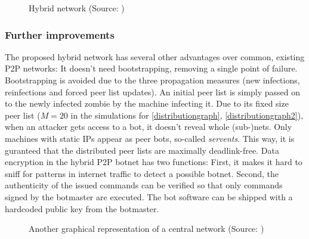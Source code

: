 \documentclass{llncs}
\begin{document}
\begin{figure}[htbp]
  \centering
  \caption{Hybrid network (Source: \cite{td1sc})}
  \label{hybrid-network}
\end{figure}

\subsubsection{Further improvements}
\label{hybridimprovs}
The proposed hybrid network has several other advantages over common,
existing P2P networks: It doesn't need bootstrapping, removing a
single point of failure. Bootstrapping is avoided due to the three
propagation measures (new infections, reinfections and forced peer
list updates). An initial peer list is simply passed on to the newly
infected zombie by the machine infecting it. Due to its fixed size
peer list ($M=20$ in the simulations for \ref{distributiongraph},
\ref{distributiongraph2}), when an attacker gets access to a bot, it
doesn't reveal whole (sub-)nets.  Only machines with static IPs appear
as peer bots, so-called {\it servents}. This way, it is guranteed that
the distributed peer lists are maximally deadlink-free. Data
encryption in the hybrid P2P botnet has two functions: First, it makes
it hard to sniff for patterns in internet traffic to detect a possible
botnet. Second, the authenticity of the issued commands can be
verified so that only commands signed by the botmaster are
executed. The bot software can be shipped with a hardcoded public key
from the botmaster.

\begin{figure}[htbp]
  \centering
  \caption{Another graphical representation of a central network (Source: \cite{td1sc})}
  \label{central-network2}
\end{figure}
\end{document}
